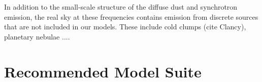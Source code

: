 \documentclass[twocolumn]{aastex631}
\begin{document}
In addition to the small-scale structure of the diffuse dust and synchrotron emission, the real sky at these frequencies contains emission from discrete sources that are not included in our models. These include cold clumps (cite Clancy), planetary nebulae ....





\section{Recommended Model Suite}\label{sec:modelsuite}
\end{document}

